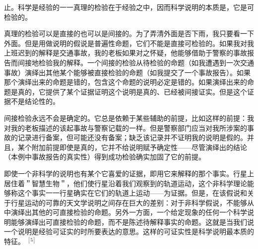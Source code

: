 止。科学是经验的一一真理的检验在于经验之中，因而科学说明的本质是，它是可检验的。

真理的检验可以是直接的也可以是间接的。为了弄清外面是否下雨，我只要看一下外面。但是用做说明的假说是普遍性命题，它们不能是直接可检验的。如果我对我上班迟到的解释是交通事故，我的老板如果对之怀疑，他能够借助于警察的事故报告而间接地检验我的解释。一个间接的检验从待检验的命题（如我遭遇到一次交通事故）演绎出其他某个能够被直接检验的命题（如我提交了一个事故报告）。如果那个演绎出来的命题是错的，包含这个命题的说明必定是错的。如果演绎出来的命题是真的，它提供了某个证据证明这个说明是真的、已经被间接证实。但是这个证据不是结论性的。

间接检验永远不会是确定的。它总是依赖于某些辅助的前提，比如这样的前提：我对我的老板描述的该起事故与警察记载的一样。但是警察部门应当对我所涉案的事故的记录进行备案，但可能还没有备案；缺乏该记录并不证明我的说明是假的。并且，某个附加前提即使是真的，它并不给说明赋予确定性——尽管演绎出的结论（本例中事故报告的真实性）得到成功检验确实加固了它的前提。

即使一个非科学的说明也有某个它喜爱的证据，即用它来解释的那个事实。行星上居住着＂智慧生物＂，他们使行星沿着我们观察到的轨道运动，这个非科学理论能够称这个事实一一行星确实在它们的轨道上运动——为证据。但是，在该假说和关于行星运动的可靠的天文学说明之间存在巨大的差别：对于非科学假说，不能够从中演绎出其他的可直接检验的命题。另外一方面，一个给定现象的任何一个科学说明能够演绎出可直接检验的命题，而不是陈述待解释事实的命题。这就是当我们说一个说明是经验可证实的时所要表达的意思。这样的可证实性是科学说明最本质的特征。 ${ }^{[5]}$ 